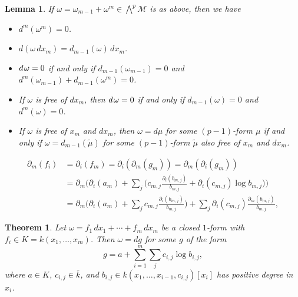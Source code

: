 \documentclass[10pt,a4paper]{amsart}
\newtheorem{lem}{Lemma}
\newtheorem{thm}{Theorem}
\begin{document}
\begin{lem}
\label{LEM:form}
If $\omega = \omega_{m-1} + \omega^m  \in \bigwedge^p \mathcal{M}$ is as above, then we have
\begin{itemize}
\item[{\rm(i)}] $d^m (\omega^m) = 0$.
\item[{\rm(ii)}] $d(\omega \,dx_m) = d_{m-1}(\omega)\, dx_m$.
\item[{\rm(iii)}] $d\hskip1pt\omega =0$ if and only if  $d_{m-1}(\omega_{m-1}) = 0$ and $d^m(\omega_{m-1})  + d_{m-1}(\omega^m)=0$.
\item[{\rm(iv)}] If $\omega$ is free of $dx_m$, then $d\hskip1pt\omega = 0$ if and only if  $d_{m-1}(\omega) = 0$ and $d^m (\omega) = 0$.
\item[{\rm(v)}] If $\omega $ is free of $x_m$ and $dx_m$, then $\omega = d\mu$ for some $(p-1)$-form $\mu$ if and only if $ \omega = d_{m-1}(\tilde \mu)$ for some $(p-1)$-form $\tilde \mu$ also free of $x_m$ and $dx_m$.
\end{itemize}
\end{lem}

\begin{equation}\label{EQ:partialfm} 
\begin{aligned}
 \partial_m(f_i) &= \partial_i(f_m) = \partial_i(\partial_m(g_m))= \partial_m(\partial_i(g_m))\\
  &= \partial_m\bigg(\partial_i(a_m) + \sum_j \Big(c_{m, j}\frac{\partial_i(b_{m, j})}{b_{m, j}} + \partial_i(c_{m, j}) \log b_{m, j}\Big)\!\bigg) \\
 &= \partial_m\bigg(\partial_i(a_m) + \sum_j c_{m, j} \frac{\partial_i(b_{m, j})}{b_{m, j}} \bigg) + \sum_j \partial_i(c_{m, j})\frac{\partial_m(b_{m, j})}{b_{m, j}},
\end{aligned}
\end{equation}

\begin{thm}
\label{THM:1form}
Let $\omega = f_1\, dx_1 + \cdots + f_m \, dx_m$ be a closed $1$-form with $f_i \in K = k(x_1,\dots,x_m)$. 
Then $\omega = dg$ for some $g$ of the form
\[
g = a + \sum_{i=1}^m \sum_j c_{i,j} \log b_{i,j},
\]
where  $a \in K$, $c_{i,j} \in  \bar k$, and $b_{i,j} \in k(x_1,\ldots,x_{i-1},c_{i,j})[x_i]$ has positive degree in~$x_i$.
\end{thm}
\end{document}
